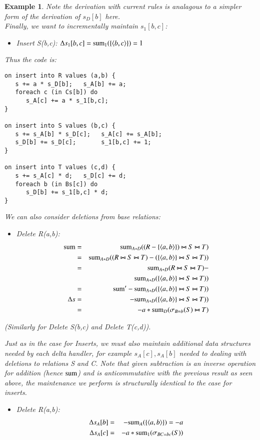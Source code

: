 \documentclass{article}
\newtheorem{example}[theorem]{Example}
\newcommand{\tuple}[1]{{\langle#1\rangle}}
\begin{document}
\begin{example}
Note the derivation with current rules is analagous to a simpler form of the derivation of $s_D[b]$ here.
\\

Finally, we want to incrementally maintain $s_1[b,c]$:
\begin{itemize}
\item
Insert S(b,c):
$
\Delta s_1[b,c] =
\algsum_{1}(\{\tuple{b,c}\}) = 1
$
\end{itemize}

Thus the code is:
\begin{verbatim}
on insert into R values (a,b) {
   s += a * s_D[b];   s_A[b] += a;
   foreach c (in Cs[b]) do
      s_A[c] += a * s_1[b,c];
}

on insert into S values (b,c) {
   s += s_A[b] * s_D[c];   s_A[c] += s_A[b];
   s_D[b] += s_D[c];       s_1[b,c] += 1;
}

on insert into T values (c,d) {
   s += s_A[c] * d;   s_D[c] += d;
   foreach b (in Bs[c]) do
      s_D[b] += s_1[b,c] * d;
}
\end{verbatim}

We can also consider deletions from base relations:
\begin{itemize}
\item
Delete R(a,b):
\begin{eqnarray*}
\algsum &=& \algsum_{A*D}((R-\{\tuple{a,b}\}) \bowtie S \bowtie T)\\
&=& \algsum_{A*D}((R \bowtie S \bowtie T) -
(\{\tuple{a,b}\} \bowtie S \bowtie T))\\
&=& \algsum_{A*D}(R \bowtie S \bowtie T) -\\
& & \algsum_{A*D}(\{\tuple{a,b}\} \bowtie S \bowtie T))\\
&=& \algsum' - \algsum_{A*D}(\{\tuple{a,b}\} \bowtie S \bowtie T))\\
\Delta s &=&  - \algsum_{A*D}(\{\tuple{a,b}\} \bowtie S \bowtie T))\\
&=& -a*\algsum_{D}(\sigma_{B=b}(S) \bowtie T)
\end{eqnarray*} 
\end{itemize}

(Similarly for Delete S(b,c) and Delete T(c,d)).

Just as in the case for Inserts, we must also maintain additional data
structures needed by each delta handler, for example $s_{A}[c], s_{A}[b]$ needed
to dealing with deletions to relations S and C. Note that given subtraction is an
inverse operation for addition (hence $\mathrm{sum}$) and is anticommutative with the
previous result as seen above, the maintenance we perform is
structurally identical to the case for inserts. 

\begin{itemize}
\item
Delete R(a,b):
\begin{eqnarray*}
\Delta s_{A}[b] &=& - \algsum_{A}(\{\tuple{a,b}\}) = -a\\
\Delta s_{A}[c] &=& -a * \algsum_{1}(\sigma_{BC=bc}(S))
\end{eqnarray*}
\end{itemize}
\end{example}
\def\algmon{\mathrm{mon}}
\end{document}
